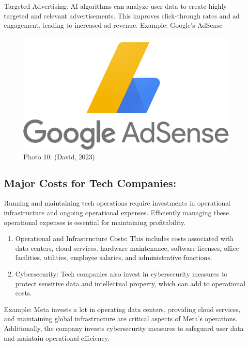 \documentclass[
]{article}
\begin{document}
Targeted Advertising: AI algorithms can analyze user data to create highly targeted and relevant advertisements. This improves click-through rates and ad engagement, leading to increased ad revenue.
Example: Google's AdSense

\begin{figure}
\centering
\includegraphics{tech3.png}
\caption{Photo 10: (David, 2023)}
\end{figure}

\hypertarget{major-costs-for-tech-companies}{%
\subsection{Major Costs for Tech Companies:}\label{major-costs-for-tech-companies}}

Running and maintaining tech operations require investments in operational infrastructure and ongoing operational expenses. Efficiently managing these operational expenses is essential for maintaining profitability.

\begin{enumerate}
\def\labelenumi{\arabic{enumi}.}
\item
  Operational and Infrastructure Costs: This includes costs associated with data centers, cloud services, hardware maintenance, software licenses, office facilities, utilities, employee salaries, and administrative functions.
\item
  Cybersecurity: Tech companies also invest in cybersecurity measures to protect sensitive data and intellectual property, which can add to operational costs.
\end{enumerate}

Example: Meta invests a lot in operating data centers, providing cloud services, and maintaining global infrastructure are critical aspects of Meta's operations. Additionally, the company invests cybersecurity measures to safeguard user data and maintain operational efficiency.
\end{document}

